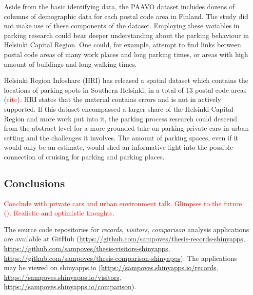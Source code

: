 Aside from the basic identifying data, the PAAVO dataset includes dozens of columns of demographic data for each postal code area in Finland. The study did not make use of these components of the dataset. Employing these variables in parking research could bear deeper understanding about the parking behaviour in Helsinki Capital Region. One could, for example, attempt to find links between postal code areas of many work places and long parking times, or areas with high amount of buildings and long walking times.

Helsinki Region Infoshare (HRI) has released a spatial dataset which contains the locations of parking spots in Southern Helsinki, in a total of 13 postal code areas (\textcolor{red}{cite}). HRI states that the material contains errors and is not in actively supported. If this dataset encompassed a larger share of the Helsinki Capital Region and more work put into it, the parking process research could descend from the abstract level for a more grounded take on parking private cars in urban setting and the challenges it involves. The amount of parking spaces, even if it would only be an estimate, would shed an informative light into the possible connection of cruising for parking and parking places.

\newpage
\subsection{Conclusions}
\justify


\textcolor{red}{Conclude with private cars and urban environment talk. Glimpses to the future (\cite{ElinaBrandtMatleenaLindeqvist2016}). Realistic and optimistic thoughts.}

The source code repositories for \textit{records}, \textit{visitors}, \textit{comparison} analysis applications are available at GitHub (\textcolor{blue}{\url{https://github.com/sampoves/thesis-records-shinyapps}}, \textcolor{blue}{\url{https://github.com/sampoves/thesis-visitors-shinyapps}}, \textcolor{blue}{\url{https://github.com/sampoves/thesis-comparison-shinyapps}}). The applications may be viewed on shinyapps.io (\textcolor{blue}{\url{https://sampoves.shinyapps.io/records}}, \textcolor{blue}{\url{https://sampoves.shinyapps.io/visitors}}, \textcolor{blue}{\url{https://sampoves.shinyapps.io/comparison}}).